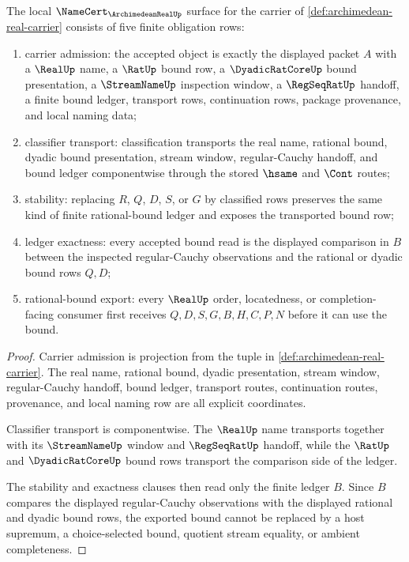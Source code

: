 \begin{theorem}
\label{thm:archimedean-real-namecert-obligations}
The local $\NameCert_{\ArchimedeanRealUp}$ surface for the carrier of \autoref{def:archimedean-real-carrier} consists of five finite obligation rows:
\begin{enumerate}
\item carrier admission: the accepted object is exactly the displayed packet $A$ with a $\RealUp$ name, a $\RatUp$ bound row, a $\DyadicRatCoreUp$ bound presentation, a $\StreamNameUp$ inspection window, a $\RegSeqRatUp$ handoff, a finite bound ledger, transport rows, continuation rows, package provenance, and local naming data;
\item classifier transport: classification transports the real name, rational bound, dyadic bound presentation, stream window, regular-Cauchy handoff, and bound ledger componentwise through the stored $\hsame$ and $\Cont$ routes;
\item stability: replacing $R$, $Q$, $D$, $S$, or $G$ by classified rows preserves the same kind of finite rational-bound ledger and exposes the transported bound row;
\item ledger exactness: every accepted bound read is the displayed comparison in $B$ between the inspected regular-Cauchy observations and the rational or dyadic bound rows $Q,D$;
\item rational-bound export: every $\RealUp$ order, locatedness, or completion-facing consumer first receives $Q,D,S,G,B,H,C,P,N$ before it can use the bound.
\end{enumerate}
\end{theorem}
\begin{proof}
Carrier admission is projection from the tuple in \autoref{def:archimedean-real-carrier}. The real name, rational bound, dyadic presentation, stream window, regular-Cauchy handoff, bound ledger, transport routes, continuation routes, provenance, and local naming row are all explicit coordinates.

Classifier transport is componentwise. The $\RealUp$ name transports together with its $\StreamNameUp$ window and $\RegSeqRatUp$ handoff, while the $\RatUp$ and $\DyadicRatCoreUp$ bound rows transport the comparison side of the ledger.

The stability and exactness clauses then read only the finite ledger $B$. Since $B$ compares the displayed regular-Cauchy observations with the displayed rational and dyadic bound rows, the exported bound cannot be replaced by a host supremum, a choice-selected bound, quotient stream equality, or ambient completeness.
\end{proof}


